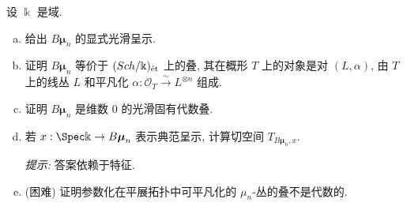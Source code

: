 \begin{exercise}\label{src:7.3.12}
设 $\Bbbk$ 是域.
\begin{enumerate}[(a)]
\item 给出 $B\boldsymbol\mu_n$ 的显式光滑呈示.
\item 证明 $B\boldsymbol\mu_n$ 等价于 $(Sch/\Bbbk)_{\text{ét}}$ 上的叠, 其在概形 $T$ 上的对象是对 $(L,\alpha)$, 由 $T$ 上的线丛 $L$ 和平凡化 $\alpha:\mathcal O_T\xrightarrow{\sim}L^{\otimes n}$ 组成.
\item 证明 $B\boldsymbol\mu_n$ 是维数 $0$ 的光滑固有代数叠.
\item 若 $x:\Spec\Bbbk\to B\boldsymbol\mu_n$ 表示典范呈示, 计算切空间 $T_{B\boldsymbol\mu_n,x}$.

\textit{提示:} 答案依赖于特征.
\item (困难) 证明参数化在平展拓扑中可平凡化的 $\mu_n$-丛的叠不是代数的.
\end{enumerate}
\end{exercise}
